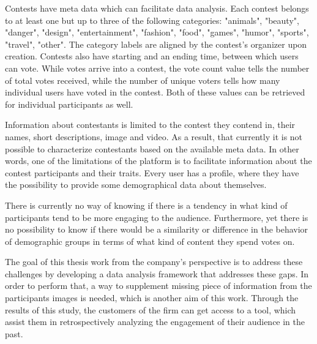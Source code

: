     Contests have meta data which can facilitate data analysis. Each contest belongs to at least one but up to three of the following categories: "animals", "beauty", "danger", "design", "entertainment", "fashion", "food", "games", "humor", "sports", "travel", "other". The category labels are aligned by the contest's organizer upon creation. Contests also have starting and an ending time, between which users can vote. While votes arrive into a contest, the vote count value tells the number of total votes received, while the number of unique voters tells how many individual users have voted in the contest. Both of these values can be retrieved for individual participants as well. 

    Information about contestants is limited to the contest they contend in, their names, short descriptions, image and video. As a result, that currently it is not possible to characterize contestants based on the available meta data. In other words, one of the limitations of the platform is to facilitate information about the contest participants and their traits. Every user has a profile, where they have the possibility to provide some demographical data about themselves.
    
    There is currently no way of knowing if there is a tendency in what kind of participants tend to be more engaging to the audience. Furthermore, yet there is no possibility to know if there would be a similarity or difference in the behavior of demographic groups in terms of what kind of content they spend votes on. 
    
    The goal of this thesis work from the company's perspective is to address these challenges by developing a data analysis framework that addresses these gaps. In order to perform that, a way to supplement missing piece of information from the participants images is needed, which is another aim of this work. Through the results of this study, the customers of the firm can get access to a tool, which assist them in retrospectively analyzing the engagement of their audience in the past.

